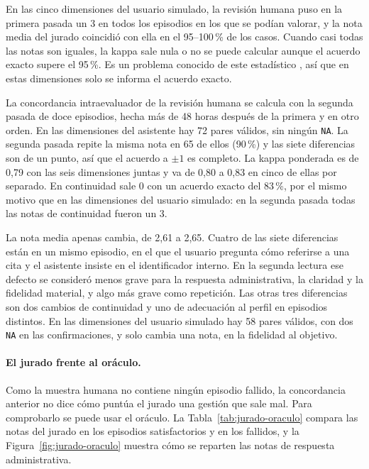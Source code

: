 En las cinco dimensiones del usuario simulado, la revisión humana puso en la
primera pasada un 3 en todos los episodios en los que se podían valorar, y la nota media del jurado
coincidió con ella en el 95--100\,\% de los casos. Cuando casi todas las notas
son iguales, la kappa sale nula o no se puede calcular aunque el acuerdo exacto
supere el 95\,\%. Es un problema conocido de este estadístico
\citep{feinstein1990kappa}, así que en estas dimensiones solo se informa el
acuerdo exacto.

La concordancia intraevaluador de la revisión humana se calcula con la
segunda pasada de doce episodios, hecha más de 48 horas después de la primera
y en otro orden. En las dimensiones del asistente hay 72 pares válidos, sin
ningún \texttt{NA}. La segunda pasada repite la misma nota en 65 de ellos
(90\,\%) y las siete diferencias son de un punto, así que el acuerdo a $\pm1$
es completo. La kappa ponderada es de 0,79 con las seis dimensiones juntas y
va de 0,80 a 0,83 en cinco de ellas por separado. En continuidad sale 0 con un
acuerdo exacto del 83\,\%, por el mismo motivo que en las dimensiones del
usuario simulado: en la segunda pasada todas las notas de continuidad fueron
un 3.

La nota media apenas cambia, de 2,61 a 2,65. Cuatro de las siete diferencias
están en un mismo episodio, en el que el usuario pregunta cómo referirse a una
cita y el asistente insiste en el identificador interno. En la segunda lectura
ese defecto se consideró menos grave para la respuesta administrativa, la
claridad y la fidelidad material, y algo más grave como repetición. Las otras
tres diferencias son dos cambios de continuidad y uno de adecuación al perfil
en episodios distintos. En las dimensiones del usuario simulado hay 58 pares
válidos, con dos \texttt{NA} en las confirmaciones, y solo cambia una nota, en
la fidelidad al objetivo.

\paragraph{El jurado frente al oráculo.}
Como la muestra humana no contiene ningún episodio fallido, la concordancia
anterior no dice cómo puntúa el jurado una gestión que sale mal. Para
comprobarlo se puede usar el oráculo. La Tabla~\ref{tab:jurado-oraculo} compara
las notas del jurado en los episodios satisfactorios y en los fallidos, y la
Figura~\ref{fig:jurado-oraculo} muestra cómo se reparten las notas de respuesta
administrativa.

\begin{table}[!htbp]
\centering
\small
\caption[Notas del jurado según el resultado del oráculo.]{Nota media del
jurado en los episodios satisfactorios y fallidos según el oráculo. El AUC
(área bajo la curva ROC) estima la probabilidad de que un fallo reciba menos nota que un éxito (0,5
indica que la dimensión no los distingue).}
\label{tab:jurado-oraculo}

\end{table}


